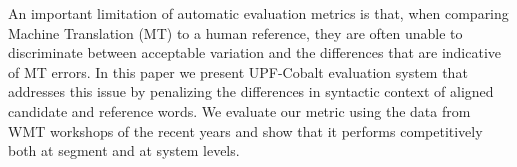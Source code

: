 An important limitation of automatic evaluation metrics is that, when comparing Machine Translation (MT) to a human reference, they are often unable to discriminate between acceptable variation and the differences that are indicative of MT errors. In this paper we present UPF-Cobalt evaluation system that addresses this issue by penalizing the differences in syntactic context of aligned candidate and reference words. We evaluate our metric using the data from WMT workshops of the recent years and show that it performs competitively both at segment and at system levels.
